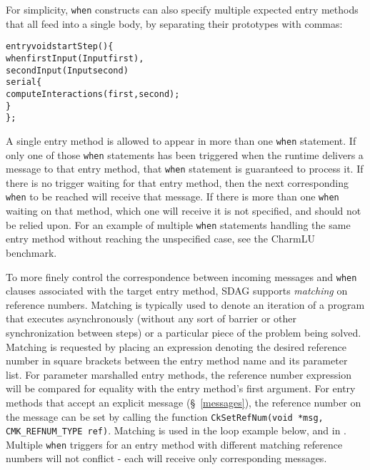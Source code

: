 For simplicity, {\tt when} constructs can also specify multiple expected entry
methods that all feed into a single body, by separating their prototypes with
commas:
\begin{center}
\begin{alltt}
entry void startStep() \{
  when firstInput(Input first),
       secondInput(Input second)
    serial \{
      computeInteractions(first, second);
    \}
\};
\end{alltt}
\end{center}

A single entry method is allowed to appear in more than one {\tt when} statement.
If only one of those {\tt when} statements has been triggered when the runtime
delivers a message to that entry method, that {\tt when} statement is guaranteed
to process it. If there is no trigger waiting for that entry method, then the
next corresponding {\tt when} to be reached will receive that message. If there is
more than one {\tt when} waiting on that method, which one will receive it is not
specified, and should not be relied upon. For an example of multiple {\tt when}
statements handling the same entry method without reaching the unspecified case,
see the CharmLU benchmark.

To more finely control the correspondence between incoming messages and {\tt when}
clauses associated with the target entry method, SDAG supports \emph{matching} on
reference numbers. Matching is typically used to denote an iteration of a program
that executes asynchronously (without any sort of barrier or other synchronization
between steps) or a particular piece of the problem being solved.
Matching is requested by placing an expression denoting the desired reference
number in square brackets between the entry method name and its parameter list.
For parameter marshalled entry methods, the reference number expression will be
compared for equality with the entry method's first argument. For entry methods
that accept an explicit message (\S~\ref{messages}), the reference number on
the message can be set by calling the function
\verb|CkSetRefNum(void *msg, CMK_REFNUM_TYPE ref)|.
Matching is used in the loop example below, and in
. Multiple {\tt when} triggers for
an entry method with different matching reference numbers will not conflict - each
will receive only corresponding messages.

